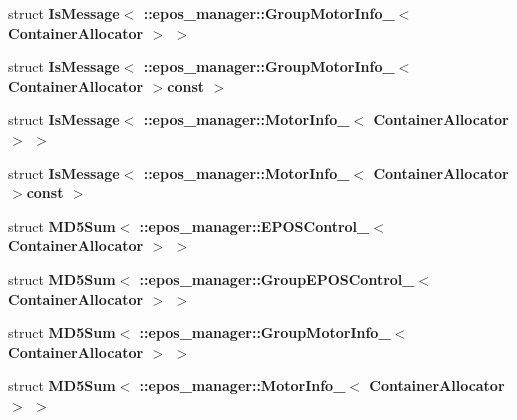 \begin{DoxyCompactItemize}
\item 
struct {\bf \-Is\-Message$<$ \-::epos\-\_\-manager\-::\-Group\-Motor\-Info\-\_\-$<$ Container\-Allocator $>$ $>$}
\item 
struct {\bf \-Is\-Message$<$ \-::epos\-\_\-manager\-::\-Group\-Motor\-Info\-\_\-$<$ Container\-Allocator $>$const  $>$}
\item 
struct {\bf \-Is\-Message$<$ \-::epos\-\_\-manager\-::\-Motor\-Info\-\_\-$<$ Container\-Allocator $>$ $>$}
\item 
struct {\bf \-Is\-Message$<$ \-::epos\-\_\-manager\-::\-Motor\-Info\-\_\-$<$ Container\-Allocator $>$const  $>$}
\item 
struct {\bf \-M\-D5\-Sum$<$ \-::epos\-\_\-manager\-::\-E\-P\-O\-S\-Control\-\_\-$<$ Container\-Allocator $>$ $>$}
\item 
struct {\bf \-M\-D5\-Sum$<$ \-::epos\-\_\-manager\-::\-Group\-E\-P\-O\-S\-Control\-\_\-$<$ Container\-Allocator $>$ $>$}
\item 
struct {\bf \-M\-D5\-Sum$<$ \-::epos\-\_\-manager\-::\-Group\-Motor\-Info\-\_\-$<$ Container\-Allocator $>$ $>$}
\item 
struct {\bf \-M\-D5\-Sum$<$ \-::epos\-\_\-manager\-::\-Motor\-Info\-\_\-$<$ Container\-Allocator $>$ $>$}
\end{DoxyCompactItemize}
